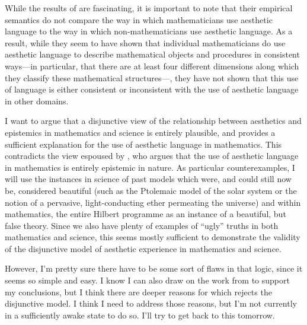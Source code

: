\documentclass[a4paper,man,natbib]{apa6}
\begin{document}
While the results of \cite{inglis_beauty_2015} are fascinating, it is important to note that their empirical
semantics do not compare the way in which mathematicians use aesthetic language to the way in which non-mathematicians
use aesthetic language. As a result, while they seem to have shown that individual mathematicians do use aesthetic
language to describe mathematical objects and procedures in consistent ways---in particular, that there are
at least four different dimensions along which they classify these mathematical structures---, they have not shown that this use
of language is either consistent or inconsistent with the use of aesthetic language in other domains. 


I want to argue that a disjunctive view of the relationship between aesthetics and epistemics in mathematics
and science is entirely plausible, and provides a sufficient explanation for the use of aesthetic language
in mathematics. This contradicts the view espoused by \cite{todd_unmasking_2008}, who argues that the
use of aesthetic language in mathematics is entirely epistemic in nature. As particular counterexamples,
I will use the instances in science of past models which were, and could still now be, considered beautiful (such
as the Ptolemaic model of the solar system or the notion of a pervasive, light-conducting ether permeating the
universe) and within mathematics, the entire Hilbert programme as an instance of a beautiful, but false theory.
Since we also have plenty of examples of ``ugly'' truths in both mathematics and science, this seems mostly sufficient
to demonstrate the validity of the disjunctive model of aesthetic experience in mathematics and science.

However, I'm pretty sure there have to be some sort of flaws in that logic, since it seems so simple and easy. I know
I can also draw on the work from \cite{inglis_beauty_2015} to support my conclusions, but I think there are deeper
reasons for which \cite{todd_unmasking_2008} rejects the disjunctive model. I think I need to address those reasons,
but I'm not currently in a sufficiently awake state to do so. I'll try to get back to this tomorrow.


\end{document}
